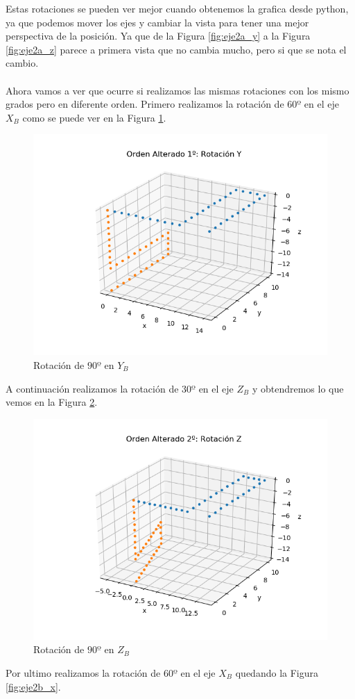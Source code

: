 \documentclass[12pt,a4paper]{report}
\begin{document}
Estas rotaciones se pueden ver mejor cuando obtenemos la grafica desde python, ya que podemos mover los ejes y cambiar la vista para tener una mejor perspectiva de la posición. Ya que de la Figura \ref{fig:eje2a_y} a la Figura \ref{fig:eje2a_z} parece a primera vista que no cambia mucho, pero si que se nota el cambio. \\ \\Ahora vamos a ver que ocurre si realizamos las mismas rotaciones con los mismo grados pero en diferente orden.
Primero realizamos la rotación de $60º$ en el eje $X_B$ como se puede ver en la Figura \ref{fig:eje2b_y}.
\begin{figure}[H]
	\centering
	\includegraphics[width=0.7\linewidth]{img/eje2b_x.png}
	\caption{Rotación de $90º$ en $Y_B$}
	\label{fig:eje2b_y}
\end{figure}
A continuación realizamos la rotación de $30º$ en el eje $Z_B$ y obtendremos lo que vemos en la Figura \ref{fig:eje2b_z}.
\begin{figure}[H]
	\centering
	\includegraphics[width=0.7\linewidth]{img/eje2b_y.png}
	\caption{Rotación de $90º$ en $Z_B$}
	\label{fig:eje2b_z}
\end{figure}
Por ultimo realizamos la rotación de $60º$ en el eje $X_B$ quedando la Figura \ref{fig:eje2b_x}.
\end{document}
